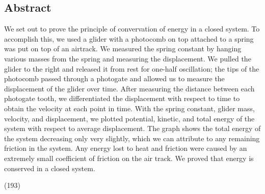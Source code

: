 \documentclass[11pt]{report}
\begin{document}
\subsection*{Abstract}
We set out to prove the principle of convervation of energy in a closed system.
To accomplish this, we used a glider with a photocomb on top attached to a 
spring was put on top of an airtrack.  We measured the spring constant by
hanging various masses from the spring and measuring the displacement.
We pulled the glider to the right and released it from rest for one-half 
oscillation; the tips of the photocomb passed through a photogate and allowed 
us to measure the displacement of the glider over time.  After measuring the 
distance between each photogate tooth, we differentiated the displacement with 
respect to time to obtain the velocity at each point in time.   With the spring
constant, glider mass, velocity, and displacement, we plotted potential,
kinetic, and total energy of the system with respect to average displacement.
The graph shows the total energy of the system decreasing only very slightly, 
which we can attribute to any remaining friction in the system.  Any energy lost
to heat and friction were caused by an extremely small coefficient of friction
on the air track.  We proved that energy is conserved in a closed system.

(193)
\end{document}
